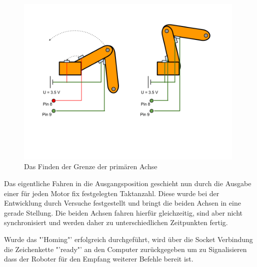 \begin{figure}[H]
\centering
\includegraphics[width=11cm]{images/Homing2}
\caption{Das Finden der Grenze der primären Achse}
\end{figure}

Das eigentliche Fahren in die Ausgangsposition geschieht nun durch die Ausgabe einer für jeden Motor fix festgelegten Taktanzahl. Diese wurde bei der Entwicklung durch Versuche festgestellt und bringt die beiden Achsen in eine gerade Stellung. Die beiden Achsen fahren hierfür gleichzeitig, sind aber nicht synchronisiert und werden daher zu unterschiedlichen Zeitpunkten fertig. 

Wurde das "'Homing"' erfolgreich durchgeführt, wird über die Socket Verbindung die Zeichenkette "'ready"' an den Computer zurückgegeben um zu Signalisieren dass der Roboter für den Empfang weiterer Befehle bereit ist.
